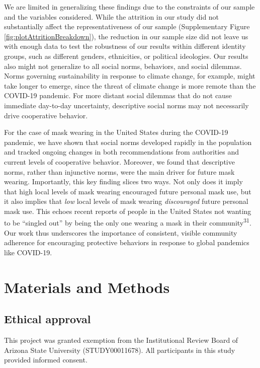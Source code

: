 \documentclass[
  man, donotrepeattitle,floatsintext]{apa6}
\begin{document}
We are limited in generalizing these findings due to the constraints of our sample and the variables considered. While the attrition in our study did not substantially affect the representativeness of our sample (Supplementary Figure \ref{fig:plotAttritionBreakdown}),
the reduction in our sample size did not leave us with enough data to test the robustness of our results within different identity groups, such as different genders, ethnicities, or political ideologies. Our results also might not generalize to all social norms, behaviors, and social dilemmas. Norms governing sustainability in response to climate change, for example, might take longer to emerge, since the threat of climate change is more remote than the COVID-19 pandemic. For more distant social dilemmas that do not cause immediate day-to-day uncertainty, descriptive social norms may not necessarily drive cooperative behavior.

For the case of mask wearing in the United States during the COVID-19 pandemic, we have shown that social norms developed rapidly in the population and tracked ongoing changes in both recommendations from authorities and current levels of cooperative behavior. Moreover, we found that descriptive norms, rather than injunctive norms, were the main driver for future mask wearing. Importantly, this key finding slices two ways. Not only does it imply that high local levels of mask wearing encouraged future personal mask use, but it also implies that \emph{low} local levels of mask wearing \emph{discouraged} future personal mask use. This echoes recent reports of people in the United States not wanting to be ``singled out'' by being the only one wearing a mask in their community\textsuperscript{31}. Our work thus underscores the importance of consistent, visible community adherence for encouraging protective behaviors in response to global pandemics like COVID-19.

\hypertarget{materials-and-methods}{%
\section{Materials and Methods}\label{materials-and-methods}}

\hypertarget{ethical-approval}{%
\subsection{Ethical approval}\label{ethical-approval}}

This project was granted exemption from the Institutional Review Board of Arizona State University (STUDY00011678). All participants in this study provided informed consent.
\end{document}
